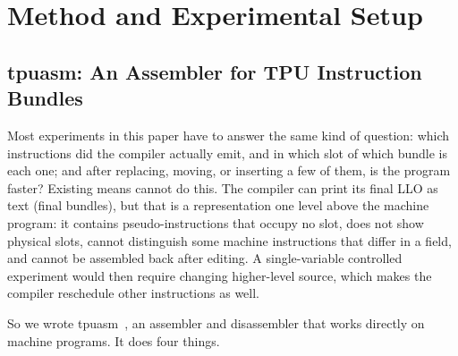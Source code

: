 \documentclass[sigconf,nonacm,balance=false]{acmart}
\begin{document}
\section{Method and Experimental Setup}
\label{sec:3}

\subsection{tpuasm: An Assembler for TPU Instruction Bundles}
\label{sec:3.1}

Most experiments in this paper have to answer the same kind of question: which instructions did the compiler actually emit, and in which slot of which bundle is each one; and after replacing, moving, or inserting a few of them, is the program faster? Existing means cannot do this. The compiler can print its final LLO as text (final bundles), but that is a representation one level above the machine program: it contains pseudo-instructions that occupy no slot, does not show physical slots, cannot distinguish some machine instructions that differ in a field, and cannot be assembled back after editing. A single-variable controlled experiment would then require changing higher-level source, which makes the compiler reschedule other instructions as well.

So we wrote tpuasm~\cite{tpuasm}, an assembler and disassembler that works directly on machine programs. It does four things.
\end{document}
